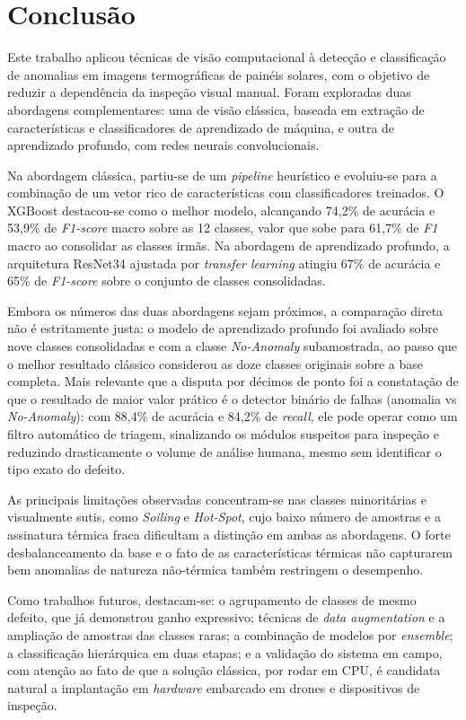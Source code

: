 \documentclass[a4paper,11pt]{article}
\begin{document}
\section{Conclusão}

Este trabalho aplicou técnicas de visão computacional à detecção e classificação de anomalias em imagens termográficas de painéis solares, com o objetivo de reduzir a dependência da inspeção visual manual. Foram exploradas duas abordagens complementares: uma de visão clássica, baseada em extração de características e classificadores de aprendizado de máquina, e outra de aprendizado profundo, com redes neurais convolucionais.

Na abordagem clássica, partiu-se de um \textit{pipeline} heurístico e evoluiu-se para a combinação de um vetor rico de características com classificadores treinados. O XGBoost destacou-se como o melhor modelo, alcançando 74,2\% de acurácia e 53,9\% de \textit{F1-score} macro sobre as 12 classes, valor que sobe para 61,7\% de \textit{F1} macro ao consolidar as classes irmãs. Na abordagem de aprendizado profundo, a arquitetura ResNet34 ajustada por \textit{transfer learning} atingiu 67\% de acurácia e 65\% de \textit{F1-score} sobre o conjunto de classes consolidadas.

Embora os números das duas abordagens sejam próximos, a comparação direta não é estritamente justa: o modelo de aprendizado profundo foi avaliado sobre nove classes consolidadas e com a classe \textit{No-Anomaly} subamostrada, ao passo que o melhor resultado clássico considerou as doze classes originais sobre a base completa. Mais relevante que a disputa por décimos de ponto foi a constatação de que o resultado de maior valor prático é o detector binário de falhas (anomalia vs \textit{No-Anomaly}): com 88,4\% de acurácia e 84,2\% de \textit{recall}, ele pode operar como um filtro automático de triagem, sinalizando os módulos suspeitos para inspeção e reduzindo drasticamente o volume de análise humana, mesmo sem identificar o tipo exato do defeito.

As principais limitações observadas concentram-se nas classes minoritárias e visualmente sutis, como \textit{Soiling} e \textit{Hot-Spot}, cujo baixo número de amostras e a assinatura térmica fraca dificultam a distinção em ambas as abordagens. O forte desbalanceamento da base e o fato de as características térmicas não capturarem bem anomalias de natureza não-térmica também restringem o desempenho.

Como trabalhos futuros, destacam-se: o agrupamento de classes de mesmo defeito, que já demonstrou ganho expressivo; técnicas de \textit{data augmentation} e a ampliação de amostras das classes raras; a combinação de modelos por \textit{ensemble}; a classificação hierárquica em duas etapas; e a validação do sistema em campo, com atenção ao fato de que a solução clássica, por rodar em CPU, é candidata natural a implantação em \textit{hardware} embarcado em drones e dispositivos de inspeção.
\end{document}
